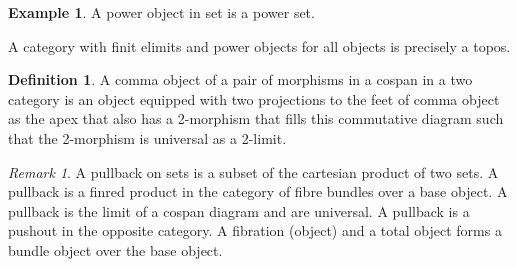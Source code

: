 \documentclass[10pt]{article}
\theoremstyle{plain}%
\theoremstyle{definition}
\newtheorem{definition}{Definition}[section]
\newtheorem{example}{Example}[section]
\theoremstyle{remark}
\newtheorem*{remark}{Remark}
\begin{document}
\begin{example}
    A power object in set is a power set.

    A category with finit elimits and power objects for all objects is precisely a topos.
\end{example}

\begin{definition}
    A comma object of a pair of morphisms in a cospan in a two category is an object equipped with two projections to the feet of comma object as the apex that also has a 2-morphism that fills this commutative diagram such that the 2-morphism is universal as a 2-limit.
\end{definition}

\begin{remark}
    A pullback on sets is a subset of the cartesian product of two sets. A pullback is a finred product in the category of fibre bundles over a base object. A pullback is the limit of a cospan diagram and are universal. A pullback is a pushout in the opposite category. A fibration (object) and a total object forms a bundle object over the base object.
\end{remark}
\end{document}
